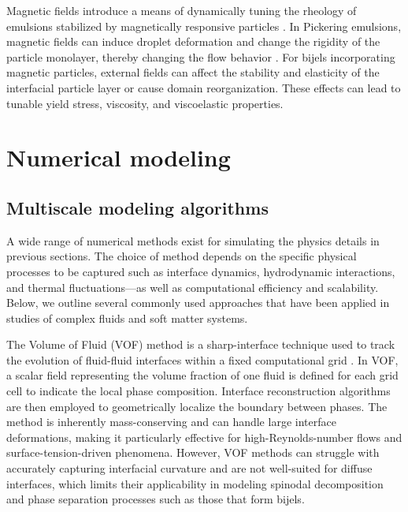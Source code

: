 Magnetic fields introduce a means of dynamically tuning the rheology of emulsions stabilized by magnetically responsive particles \cite{qiao_magnetorheological_2012}. 
In Pickering emulsions, magnetic fields can induce droplet deformation and change the rigidity of the particle monolayer, thereby changing the flow behavior \cite{qiao_magnetorheological_2012}. 
For bijels incorporating magnetic particles, external fields can affect the stability and elasticity of the interfacial particle layer or cause domain reorganization. These effects can lead to 
tunable yield stress, viscosity, and viscoelastic properties.

\section{Numerical modeling}

\subsection{Multiscale modeling algorithms}

A wide range of numerical methods exist for simulating the physics details in previous sections. The choice of method depends on the specific physical processes to be captured such as 
interface dynamics, hydrodynamic interactions, and thermal fluctuations—as well as computational efficiency and scalability. Below, we outline several commonly used approaches that have been 
applied in studies of complex fluids and soft matter systems.

The Volume of Fluid (VOF) method is a sharp-interface technique used to track the evolution of fluid-fluid interfaces within a fixed computational grid 
\cite{gopala_volume_2008, fleckenstein_volume-fluid-based_2015, deising_direct_2018}. In VOF, a scalar field representing the volume fraction of one 
fluid is defined for each grid cell to indicate the local phase composition. Interface reconstruction algorithms are then employed to geometrically 
localize the boundary between phases. The method is inherently mass-conserving and can handle large interface deformations, making it particularly 
effective for high-Reynolds-number flows and surface-tension-driven phenomena. However, VOF methods can struggle with accurately capturing interfacial 
curvature and are not well-suited for diffuse interfaces, which limits their applicability in modeling spinodal decomposition and phase separation 
processes such as those that form bijels.

